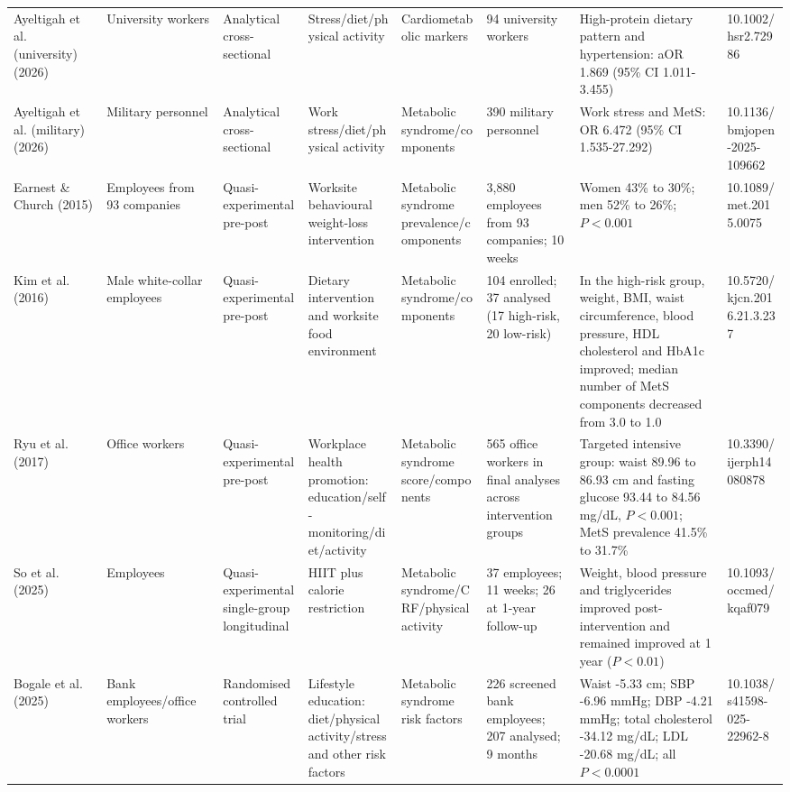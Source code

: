 \documentclass[10pt]{article}
\begin{document}
\begin{landscape}
\begin{longtable}{p{0.12\linewidth} p{0.15\linewidth} p{0.11\linewidth} p{0.12\linewidth} p{0.11\linewidth} p{0.12\linewidth} p{0.19\linewidth} p{0.08\linewidth}}
Ayeltigah et al. (university) (2026) & University workers & Analytical cross-sectional & Stress/diet/physical activity & Cardiometabolic markers & 94 university workers & High-protein dietary pattern and hypertension: aOR 1.869 (95\% CI 1.011-3.455) & 10.1002/hsr2.72986 \\
Ayeltigah et al. (military) (2026) & Military personnel & Analytical cross-sectional & Work stress/diet/physical activity & Metabolic syndrome/components & 390 military personnel & Work stress and MetS: OR 6.472 (95\% CI 1.535-27.292) & 10.1136/bmjopen-2025-109662 \\
Earnest \& Church (2015) & Employees from 93 companies & Quasi-experimental pre-post & Worksite behavioural weight-loss intervention & Metabolic syndrome prevalence/components & 3,880 employees from 93 companies; 10 weeks & Women 43\% to 30\%; men 52\% to 26\%; \(P < 0.001\) & 10.1089/met.2015.0075 \\
Kim et al. (2016) & Male white-collar employees & Quasi-experimental pre-post & Dietary intervention and worksite food environment & Metabolic syndrome/components & 104 enrolled; 37 analysed (17 high-risk, 20 low-risk) & In the high-risk group, weight, BMI, waist circumference, blood pressure, HDL cholesterol and HbA1c improved; median number of MetS components decreased from 3.0 to 1.0 & 10.5720/kjcn.2016.21.3.237 \\
Ryu et al. (2017) & Office workers & Quasi-experimental pre-post & Workplace health promotion: education/self-monitoring/diet/activity & Metabolic syndrome score/components & 565 office workers in final analyses across intervention groups & Targeted intensive group: waist 89.96 to 86.93 cm and fasting glucose 93.44 to 84.56 mg/dL, \(P < 0.001\); MetS prevalence 41.5\% to 31.7\% & 10.3390/ijerph14080878 \\
So et al. (2025) & Employees & Quasi-experimental single-group longitudinal & HIIT plus calorie restriction & Metabolic syndrome/CRF/physical activity & 37 employees; 11 weeks; 26 at 1-year follow-up & Weight, blood pressure and triglycerides improved post-intervention and remained improved at 1 year (\(P < 0.01\)) & 10.1093/occmed/kqaf079 \\
Bogale et al. (2025) & Bank employees/office workers & Randomised controlled trial & Lifestyle education: diet/physical activity/stress and other risk factors & Metabolic syndrome risk factors & 226 screened bank employees; 207 analysed; 9 months & Waist -5.33 cm; SBP -6.96 mmHg; DBP -4.21 mmHg; total cholesterol -34.12 mg/dL; LDL -20.68 mg/dL; all \(P < 0.0001\) & 10.1038/s41598-025-22962-8 \\

\end{longtable}
\end{landscape}
\end{document}

